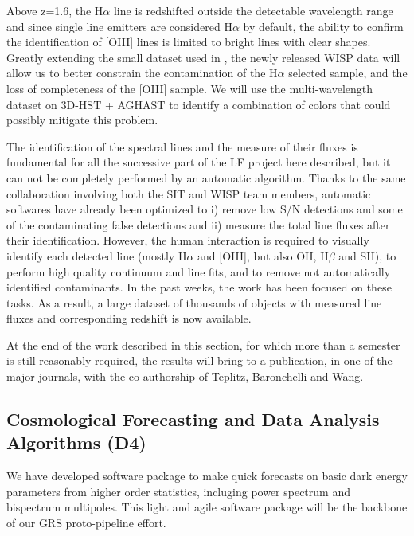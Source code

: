 Above z=1.6, the H$\alpha$ line is redshifted outside the detectable wavelength
range and since single line emitters are considered H$\alpha$ by default, the
ability to confirm the identification of [OIII] lines is limited to bright lines
with clear shapes. Greatly extending the small dataset used in
\citet{Colbert:2013ita}, the newly released WISP data will allow us to better
constrain the contamination of the H$\alpha$ selected sample, and the loss of
completeness of the [OIII] sample. We will use the multi-wavelength dataset on
3D-HST + AGHAST to identify a combination of colors that could possibly mitigate
this problem.

The identification of the spectral lines and the measure of their fluxes is
fundamental for all the successive part of the LF project here described, but it
can not be completely performed by an automatic algorithm. Thanks to the same
collaboration involving both the SIT and WISP team members, automatic softwares
have already been optimized to i) remove low S/N detections and some of the
contaminating false detections and ii) measure the total line fluxes after their
identification. However, the human interaction is required to visually identify
each detected line (mostly H$\alpha$ and [OIII], but also OII, H$\beta$ and
SII), to perform high quality continuum and line fits, and to remove not
automatically identified contaminants. In the past weeks, the work has been
focused on these tasks. As a result, a large dataset of thousands of objects
with measured line fluxes and corresponding redshift is now available.

At the end of the work described in this section, for which more than a semester is still reasonably required, the results will bring to a publication, in one of the major journals, with the co-authorship of Teplitz, Baronchelli and Wang.


 \subsection{Cosmological Forecasting and Data Analysis Algorithms (D4)}
\label{sec:grs_algo}

 \begin{summaryii}
  We have developed software package to make quick forecasts on basic dark energy parameters from higher order statistics, incluging power spectrum and bispectrum multipoles. This light and agile software package will be the backbone of our GRS proto-pipeline effort.
  \end{summaryii}

